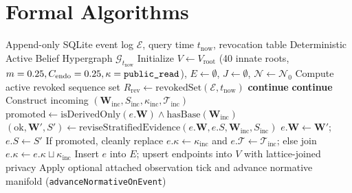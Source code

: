 \section{Formal Algorithms}
\label{app:algos}

\begin{algorithm}[H]
\caption{Order-Invariant Stratified NARS--Beta Revision and Nissenbaum Fold (Law~1)}
\label{alg:fold}
\begin{algorithmic}[1]
\Require Append-only SQLite event log $\mathcal{E}$, query time $t_{\mathrm{now}}$, revocation table
\Ensure Deterministic Active Belief Hypergraph $\mathcal{G}_{t_{\mathrm{now}}}$
\State Initialize $V \leftarrow V_{\mathrm{root}}$ (40 innate roots, $m = 0.25, C_{\mathrm{endo}} = 0.25, \kappa = \texttt{public\_read}$), $E \leftarrow \emptyset$, $J \leftarrow \emptyset$, $\mathcal{N} \leftarrow \mathcal{N}_0$
\State Compute active revoked sequence set $R_{\mathrm{rev}} \leftarrow \mathrm{revokedSet}(\mathcal{E}, t_{\mathrm{now}})$
    \State \textbf{continue}
  \EndIf
     \textbf{continue} \EndIf {}
    \State Construct incoming $(\mathbf{W}_{\mathrm{inc}}, S_{\mathrm{inc}}, \kappa_{\mathrm{inc}}, \mathcal{T}_{\mathrm{inc}})$
      \State $\mathrm{promoted} \leftarrow \mathrm{isDerivedOnly}(e.\mathbf{W}) \land \mathrm{hasBase}(\mathbf{W}_{\mathrm{inc}})$
      \State $(\mathrm{ok}, \mathbf{W}', S') \leftarrow \mathrm{reviseStratifiedEvidence}(e.\mathbf{W}, e.S, \mathbf{W}_{\mathrm{inc}}, S_{\mathrm{inc}})$
        \State $e.\mathbf{W} \leftarrow \mathbf{W}'$; $e.S \leftarrow S'$
        \State If $\mathrm{promoted}$, cleanly replace $e.\kappa \leftarrow \kappa_{\mathrm{inc}}$ and $e.\mathcal{T} \leftarrow \mathcal{T}_{\mathrm{inc}}$; else join $e.\kappa \leftarrow e.\kappa \sqcup \kappa_{\mathrm{inc}}$
      \EndIf
    \Else
      \State Insert $e$ into $E$; upsert endpoints into $V$ with lattice-joined privacy
    \EndIf
    \State Apply optional attached observation tick and advance normative manifold (\texttt{advanceNormativeOnEvent})

\end{algorithmic}
\end{algorithm}
